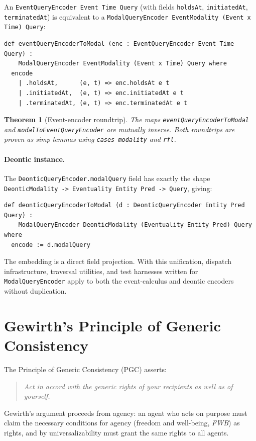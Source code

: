 \documentclass[]{article}
\newtheorem{theorem}{Theorem}
\newcommand{\code}[1]{\texttt{#1}}
\newcommand{\PGC}{\textup{PGC}}
\begin{document}
\noindent
An \code{EventQueryEncoder Event Time Query} (with fields \code{holdsAt},
\code{initiatedAt}, \code{terminatedAt}) is equivalent to a
\code{ModalQueryEncoder EventModality (Event x Time) Query}:

\begin{lstlisting}
def eventQueryEncoderToModal (enc : EventQueryEncoder Event Time Query) :
    ModalQueryEncoder EventModality (Event x Time) Query where
  encode
    | .holdsAt,      (e, t) => enc.holdsAt e t
    | .initiatedAt,  (e, t) => enc.initiatedAt e t
    | .terminatedAt, (e, t) => enc.terminatedAt e t
\end{lstlisting}

\begin{theorem}[Event-encoder roundtrip]
The maps \code{eventQueryEncoderToModal} and \code{modalToEventQueryEncoder}
are mutually inverse.
Both roundtrips are proven as simp lemmas using \code{cases modality} and \code{rfl}.
\end{theorem}

\paragraph{Deontic instance.}
The \code{DeonticQueryEncoder.modalQuery} field has exactly the shape
\code{DeonticModality -> Eventuality Entity Pred -> Query}, giving:

\begin{lstlisting}
def deonticQueryEncoderToModal (d : DeonticQueryEncoder Entity Pred Query) :
    ModalQueryEncoder DeonticModality (Eventuality Entity Pred) Query where
  encode := d.modalQuery
\end{lstlisting}

\noindent
The embedding is a direct field projection.
With this unification, dispatch infrastructure, traversal utilities, and
test harnesses written for \code{ModalQueryEncoder} apply to both the
event-calculus and deontic encoders without duplication.

\section{Gewirth's Principle of Generic Consistency}
\label{sec:pgc}

The Principle of Generic Consistency (\PGC{}) \cite{Gewirth1978} asserts:
\begin{quote}
\emph{Act in accord with the generic rights of your recipients as well as of yourself.}
\end{quote}
Gewirth's argument proceeds from agency: an agent who acts on purpose must
claim the necessary conditions for agency (freedom and well-being, \emph{FWB})
as rights, and by universalizability must grant the same rights to all agents.
\end{document}

